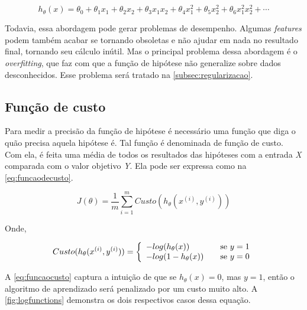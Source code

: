 \begin{equation}
\nonumber
h_{\theta}(x) = \theta_0 + \theta_1 x_1 + \theta_2 x_2 + \theta_3 x_1 x_2 + \theta_4 x_1^2 + \theta_5 x_2^2 + \theta_6 x_1^2 x_2^2 + \cdots
\end{equation}

Todavia, essa abordagem pode gerar problemas de desempenho. Algumas \textit{features} podem também acabar se tornando obsoletas e não ajudar em nada no resultado final, tornando seu cálculo inútil. Mas o principal problema dessa abordagem é o \textit{overfitting}, que faz com que a função de hipótese não generalize sobre dados desconhecidos. Esse problema será tratado na \autoref{subsec:regularizacao}.


\subsection{Função de custo}

Para medir a precisão da função de hipótese é necessário uma função que diga o quão precisa aquela hipótese é. Tal função é denominada de função de custo. Com ela, é feita uma média de todos os resultados das hipóteses com a entrada \textit{X} comparada com o valor objetivo \textit{Y}. Ela pode ser expressa como na \autoref{eq:funcaodecusto}.

\begin{equation}
\label{eq:funcaodecusto}
J(\theta) = \frac{1}{m}\sum\limits_{i=1}^{m}Custo(h_{\theta}(x^{(i)}, y^{(i)}))
\end{equation}

Onde,


\begin{align}
 Custo(h_{\theta}(x^{(i)}, y^{(i)})) = \left\{
  \begin{array}{l l} 
    -log(h_{\theta}(x)) & \quad \text{se } y=1 \\
    -log(1 - h_{\theta}(x)) & \quad \text{se } y=0 \label{eq:funcaocusto}
  \end{array} \right.
\end{align}


A \autoref{eq:funcaocusto} captura a intuição de que se $h_\theta(x) = 0$, mas $y = 1$, então o algoritmo de aprendizado será penalizado por um custo muito alto. A \autoref{fig:logfunctions} demonstra os dois respectivos casos dessa equação.


